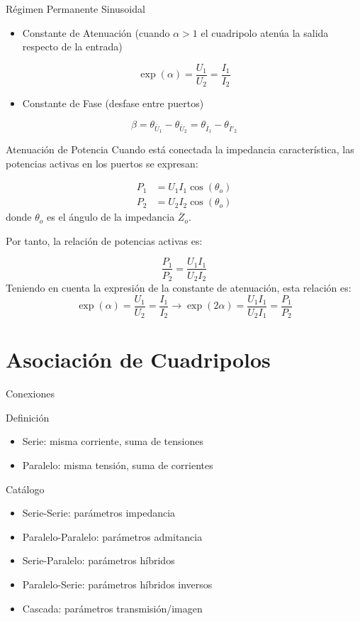 \documentclass[xcolor={usenames,svgnames,dvipsnames}]{beamer}
\begin{document}
\begin{frame}[label={sec:orgda6f4f9}]{Régimen Permanente Sinusoidal}
\begin{itemize}
\item \alert{Constante de Atenuación} (cuando \(\alpha > 1\) el cuadripolo atenúa la salida respecto de la entrada)
\end{itemize}
\[
  \exp(\alpha) = \frac{U_1}{U_2} = \frac{I_1}{I_2}
\]
\begin{itemize}
\item \alert{Constante de Fase} (desfase entre puertos)
\end{itemize}
\[
  \beta = \theta_{\overline{U}_1} - \theta_{\overline{U}_2} = \theta_{\overline{I}_1} - \theta_{\overline{I}'_2}
\]
\end{frame}

\begin{frame}[label={sec:org4756e00}]{Atenuación de Potencia}
\alert{Cuando está conectada la impedancia característica}, las potencias activas en los puertos se expresan:

\begin{align*}
  P_1 &= U_1 I_1 \cos(\theta_o)\\
  P_2 &= U_2 I_2 \cos(\theta_o)
\end{align*}
donde \(\theta_o\) es el ángulo de la impedancia \(\overline{Z}_o\).

Por tanto, la relación de potencias activas es:

\[
\frac{P_1}{P_2} = \frac{U_1 I_1}{U_2 I_2}
\]
Teniendo en cuenta la expresión de la constante de atenuación, esta relación es:
\[
    \exp(\alpha) = \frac{U_1}{U_2} = \frac{I_1}{I_2} \rightarrow \boxed{\exp(2\alpha) = \frac{U_1 I_1}{U_2 I_1} = \frac{P_1}{P_2}}
\]
\end{frame}

\section{Asociación de Cuadripolos}
\label{sec:org54130c5}

\begin{frame}[label={sec:org7c0040c}]{Conexiones}
\begin{block}{Definición}
\begin{itemize}
\item \alert{Serie}: misma corriente, suma de tensiones
\item \alert{Paralelo}: misma tensión, suma de corrientes
\end{itemize}
\end{block}
\begin{block}{Catálogo}
\begin{itemize}
\item Serie-Serie: \alert{parámetros impedancia}
\item Paralelo-Paralelo: \alert{parámetros admitancia}
\item Serie-Paralelo: \alert{parámetros híbridos}
\item Paralelo-Serie: \alert{parámetros híbridos inversos}
\item Cascada: \alert{parámetros transmisión/imagen}
\end{itemize}
\end{block}
\end{frame}
\end{document}
